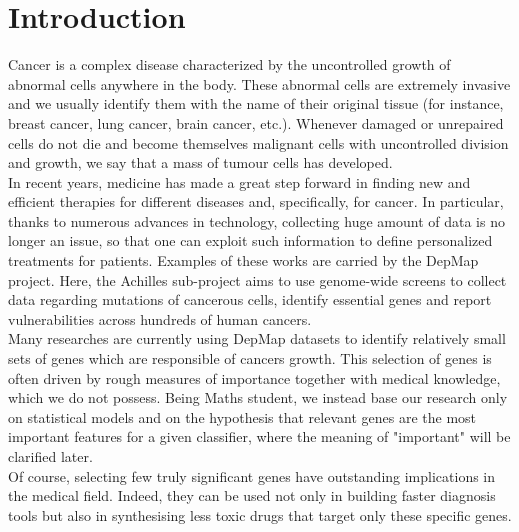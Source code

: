 \documentclass[a4paper,11pt, oneside]{article}  %
\begin{document}
\section{Introduction}
Cancer is a complex disease characterized by the uncontrolled growth of abnormal cells anywhere in the body. These abnormal cells are extremely invasive and we usually identify them with the name of their original tissue (for instance, breast cancer, lung cancer, brain cancer, etc.). Whenever damaged or unrepaired cells do not die and become themselves malignant cells with uncontrolled division and growth, we say that a mass of tumour cells has developed. \\
In recent years, medicine has made a great step forward in finding new and efficient therapies for different diseases and, specifically, for cancer. In particular, thanks to numerous advances in technology, collecting huge amount of data is no longer an issue, so that one can exploit such information to define personalized treatments for patients. Examples of these works are carried by the DepMap project. Here, the Achilles sub-project aims to use genome-wide screens to collect data regarding mutations of cancerous cells, identify essential genes and report vulnerabilities across hundreds of human cancers.  \\
Many researches are currently using DepMap datasets to identify relatively small sets of genes which are responsible of cancers growth. This selection of genes is often driven by rough measures of importance together with medical knowledge, which we do not possess. Being Maths student, we instead base our research only on statistical models and on the hypothesis that relevant genes are the most important features for a given classifier, where the meaning of "important" will be clarified later. \\
Of course, selecting few truly significant genes have outstanding implications in the medical field. Indeed, they can be used not only in building faster diagnosis tools but also in synthesising less toxic drugs that target only these specific genes. 
\end{document}
